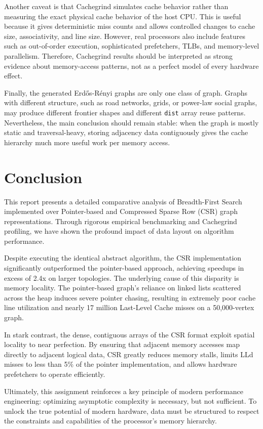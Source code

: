 \documentclass[11pt]{article}
\begin{document}
Another caveat is that Cachegrind simulates cache behavior rather than measuring the exact physical cache behavior of the host CPU. This is useful because it gives deterministic miss counts and allows controlled changes to cache size, associativity, and line size. However, real processors also include features such as out-of-order execution, sophisticated prefetchers, TLBs, and memory-level parallelism. Therefore, Cachegrind results should be interpreted as strong evidence about memory-access patterns, not as a perfect model of every hardware effect.

Finally, the generated Erd\H{o}s-R\'enyi graphs are only one class of graph. Graphs with different structure, such as road networks, grids, or power-law social graphs, may produce different frontier shapes and different \texttt{dist} array reuse patterns. Nevertheless, the main conclusion should remain stable: when the graph is mostly static and traversal-heavy, storing adjacency data contiguously gives the cache hierarchy much more useful work per memory access.

\section{Conclusion}

This report presents a detailed comparative analysis of Breadth-First Search implemented over Pointer-based and Compressed Sparse Row (CSR) graph representations. Through rigorous empirical benchmarking and Cachegrind profiling, we have shown the profound impact of data layout on algorithm performance.

Despite executing the identical abstract algorithm, the CSR implementation significantly outperformed the pointer-based approach, achieving speedups in excess of 2.4x on larger topologies. The underlying cause of this disparity is memory locality. The pointer-based graph's reliance on linked lists scattered across the heap induces severe pointer chasing, resulting in extremely poor cache line utilization and nearly 17 million Last-Level Cache misses on a 50,000-vertex graph.

In stark contrast, the dense, contiguous arrays of the CSR format exploit spatial locality to near perfection. By ensuring that adjacent memory accesses map directly to adjacent logical data, CSR greatly reduces memory stalls, limits LLd misses to less than 5\% of the pointer implementation, and allows hardware prefetchers to operate efficiently. 

Ultimately, this assignment reinforces a key principle of modern performance engineering: optimizing asymptotic complexity is necessary, but not sufficient. To unlock the true potential of modern hardware, data must be structured to respect the constraints and capabilities of the processor's memory hierarchy.
\end{document}
